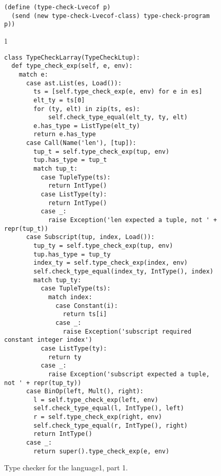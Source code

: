 \documentclass[7x10]{TimesAPriori_MIT}%
\def\pythonEd{1}
\def\edition{1}
\newcommand{\pythonColor}[0]{}
\newcommand{\python}[1]{{\if\edition\pythonEd\pythonColor #1\fi}}
\numberwithin{theorem}{chapter}
\numberwithin{definition}{chapter}
\numberwithin{equation}{chapter}
\begin{document}
\begin{figure}[tbp]
\begin{tcolorbox}[colback=white]
{\begin{lstlisting}[basicstyle=\ttfamily\footnotesize]
(define (type-check-Lvecof p)
  (send (new type-check-Lvecof-class) type-check-program p))
    \end{lstlisting}
    \fi}
{\if\edition\pythonEd\pythonColor    
\begin{lstlisting}[basicstyle=\ttfamily\footnotesize]
class TypeCheckLarray(TypeCheckLtup):
  def type_check_exp(self, e, env):
    match e:
      case ast.List(es, Load()):
        ts = [self.type_check_exp(e, env) for e in es]
        elt_ty = ts[0]
        for (ty, elt) in zip(ts, es):
            self.check_type_equal(elt_ty, ty, elt)
        e.has_type = ListType(elt_ty)
        return e.has_type
      case Call(Name('len'), [tup]):
        tup_t = self.type_check_exp(tup, env)
        tup.has_type = tup_t
        match tup_t:
          case TupleType(ts):
            return IntType()
          case ListType(ty):
            return IntType()
          case _:
            raise Exception('len expected a tuple, not ' + repr(tup_t))
      case Subscript(tup, index, Load()):
        tup_ty = self.type_check_exp(tup, env)
        tup.has_type = tup_ty
        index_ty = self.type_check_exp(index, env)
        self.check_type_equal(index_ty, IntType(), index)
        match tup_ty:
          case TupleType(ts):
            match index:
              case Constant(i):
                return ts[i]
              case _:
                raise Exception('subscript required constant integer index')
          case ListType(ty):
            return ty
          case _:
            raise Exception('subscript expected a tuple, not ' + repr(tup_ty))
      case BinOp(left, Mult(), right):
        l = self.type_check_exp(left, env)
        self.check_type_equal(l, IntType(), left)
        r = self.type_check_exp(right, env)
        self.check_type_equal(r, IntType(), right)
        return IntType()
      case _:
        return super().type_check_exp(e, env)
\end{lstlisting}
\fi}
  \end{tcolorbox}

  \caption{Type checker for the \LangArray{} language\python{, part 1}.}
\label{fig:type-check-Lvecof}
\end{figure}
\end{document}

